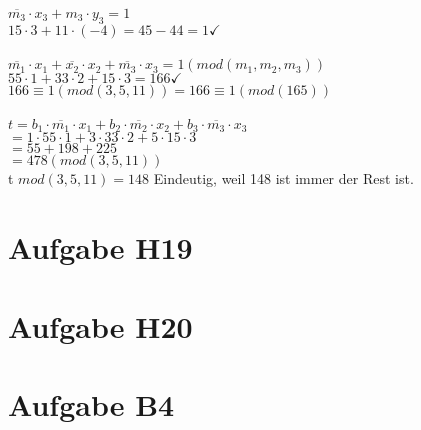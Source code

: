 \documentclass[11pt,a4paper]{article}
\begin{document}
$\overline{m_3} \cdot x_3 + m_3 \cdot y_3 = 1$\\
$15 \cdot 3 + 11 \cdot (-4) = 45 - 44 = 1 \checkmark$\\
\\
$\overline{m_1}\cdot x_1 + \overline{x_2} \cdot x_2 + \overline{m_3} \cdot x_3 = 1(mod(m_1,m_2,m_3))$\\
$55 \cdot 1 + 33 \cdot 2 + 15 \cdot 3 = 166 \checkmark$\\
$166\equiv 1 (mod(3,5,11)) = 166 \equiv 1(mod(165))$\\
\\
$t=b_1 \cdot \overline{m_1} \cdot x_1 + b_2 \cdot \overline{m_2} \cdot x_2 + b_3 \cdot \overline{m_3} \cdot x_3$\\
$= 1 \cdot 55 \cdot 1 + 3 \cdot 33 \cdot 2 + 5 \cdot 15 \cdot 3$\\
$= 55 + 198 + 225$\\
$= 478(mod(3,5,11))$\\
t $ mod(3,5,11) = 148 $
Eindeutig, weil 148 ist immer der Rest ist.

\section*{Aufgabe H19}
\section*{Aufgabe H20}
\section*{Aufgabe B4}
\end{document}
